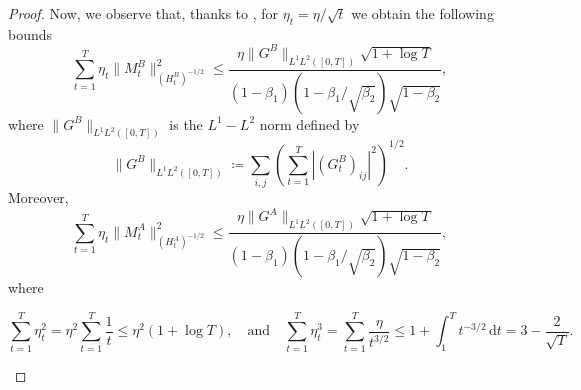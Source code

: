 \documentclass[11pt,a4paper]{article}
\numberwithin{equation}{section}
\theoremstyle{plain}
\theoremstyle{definition}
\theoremstyle{remark}
\begin{document}
\begin{proof}
    Now, we observe that, thanks to \citep[Lemma 2]{convergence_adam_beyond}, for $\eta_t = \eta/\sqrt{t}$ we obtain the following bounds
    \[
        \sum_{t=1}^T \eta_t \|M_t^B \|_{(H_t^B)^{-1/2}}^2 \leq \frac{\eta \|G^B \|_{L^1L^2([0,T])} \sqrt{1 + \log T}}{(1-\beta_1)(1-\beta_1/\sqrt{\beta_2})\sqrt{1-\beta_2}},
    \]
    where $ \|G^B \|_{L^1 L^2([0,T])}$ is the $L^1-L^2$ norm defined by
    \[
        \|G^B \|_{L^1L^2([0,T])}\coloneqq \sum_{i,j} \left( \sum_{t=1}^T \left|(G_t^B)_{ij}\right|^2 \right)^{1/2}.
    \]
    Moreover,
    \[
        \sum_{t=1}^T \eta_t \|M_t^A \|^2_{(H_t^A)^{-1/2}} \leq \frac{\eta \|G^A \|_{L^1L^2([0,T])} \sqrt{1+\log T}}{(1-\beta_1)(1-\beta_1/\sqrt{\beta_2})\sqrt{1-\beta_2}},
    \]
    where
    \begin{small}
        \begin{equation}\label{eq:bound_momentum_series}
            \sum_{t=1}^T \eta_t^2 = \eta^{2} \sum_{t=1}^T \frac{1}{t} \leq \eta^{2} (1 + \log T),
            \quad \text{and} \quad
            \sum_{t=1}^T \eta_t^3 = \sum_{t=1}^T \frac{\eta}{t^{3/2}} \leq 1+\int_{1}^T t^{-3/2} \, \mathrm{d}t = 3 - \frac{2}{\sqrt{T}}.        
    \end{equation}
    \end{small}
        

\end{proof}
\end{document}
